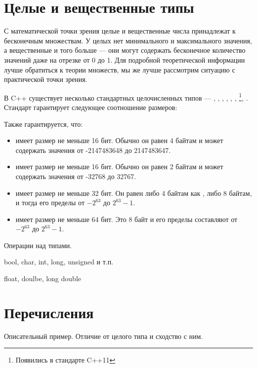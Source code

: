 \documentclass[book.tex]{subfiles}
\begin{document}
\section*{Целые и вещественные типы}

С математической точки зрения целые и вещественные числа принадлежат к бесконечным множествам. У целых нет минимального и максимального значения, а вещественные и того больше --- они могут содержать бесконечное количество значений даже на отрезке от 0 до 1. Для подробной теоретической информации лучше обратиться к теории множеств, мы же лучше рассмотрим ситуацию с практической точки зрения.


В C++ существует несколько стандартных целочисленных типов --- , , , , , , \footnote[1]{Появились в стандарте C++11}, \footnotemark[1]. Стандарт гарантирует следующее соотношение размеров:


Также гарантируется, что:

\begin{itemize}
\item {} имеет размер не меньше 16 бит. Обычно он равен 4 байтам и может содержать значения от -2147483648 до 2147483647.
\item {} имеет размер не меньше 16 бит. Обычно он равен 2 байтам и может содержать значения от -32768 до 32767.
\item {} имеет размер не меньше 32 бит. Он равен либо 4 байтам как , либо 8 байтам, и тогда его пределы от $-2^{63}$ до $2^{63} - 1$.
\item {} имеет размер не меньше 64 бит. Это 8 байт и его пределы составляют от $-2^{63}$ до $2^{63} - 1$.
\end{itemize}

Операции над типами.

bool, char, int, long, unsigned и т.п.

float, doulbe, long double

\section*{Перечисления}

Описательный пример. Отличие от целого типа и сходство с ним.
\end{document}
